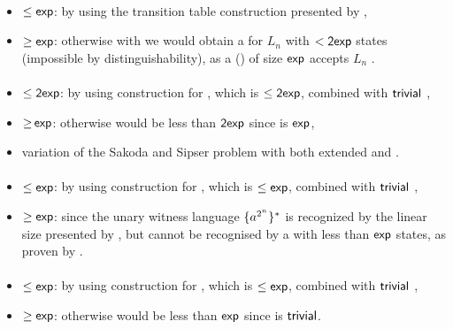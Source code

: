 \paragraph{\ODLA{}\tto\ODFA}\label{cost:1DLAto1DFA}
\begin{itemize}
	\item $\le\Cexp$: by using the transition table construction presented by ,
	\item $\ge\Cexp$: otherwise with \hyperref[cost:1DLAto1DFA]{\ODLA{}\tto\ODFA} we would obtain a \ODFA for $L_n$ with $<\Cdexp$ states (impossible by distinguishability), as a \ODLA (\TDFA) of size $\Cexp$ accepts $L_n$ \cite{PigPis14}.
\end{itemize}
\paragraph{\OLA{}\tto\ODLA}
\begin{itemize}
	\item $\le\Cdexp$: by using construction for \hyperref[cost:1LAto1DFA]{\OLA{}\tto\ODFA}, which is $\le\Cdexp$, combined with $\Ctriv$ \ODFA{}\tto\ODLA,
	\item $\ge\hspacingfix{-1pt}\Cexp$: otherwise \hyperref[cost:1LAto1DFA]{\OLA{}\tto\ODFA} would be less than $\Cdexp$ since \ODLA{}\tto\ODFA is $\Cexp$,
	\item variation of the Sakoda and Sipser problem with both extended \TNFA and \TDFA.
\end{itemize}
\paragraph{\ODLA{}\tto\TNFA}\label{cost:1DLAto2NFA}
\begin{itemize}
	\item $\le\Cexp$: by using construction for \hyperref[cost:1DLAto1DFA]{\ODLA{}\tto\ODFA}, which is $\le\Cexp$, combined with $\Ctriv$ \ODFA{}\tto\TNFA,
	\item $\ge\Cexp$: since the unary witness language $\set{a^{2^n}}\star$ is recognized by the linear size \ODLA presented by , but cannot be recognised by a \TNFA with less than $\Cexp$ states, as proven by .
\end{itemize}
\paragraph{\ODLA{}\tto\ONFA}
\begin{itemize}
	\item $\le\Cexp$: by using construction for \hyperref[cost:1DLAto1DFA]{\ODLA{}\tto\ODFA}, which is $\le\Cexp$, combined with $\Ctriv$ \ODFA{}\tto\ONFA,
	\item $\ge\Cexp$: otherwise \hyperref[cost:1DLAto2NFA]{\ODLA{}\tto\TNFA} would be less than $\Cexp$ since \ONFA{}\tto\TNFA is $\Ctriv$.
\end{itemize}
